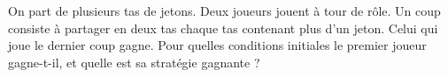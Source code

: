 On part de plusieurs tas de jetons. Deux joueurs jouent à tour de rôle. Un coup consiste à partager en deux tas chaque tas contenant plus d'un jeton. Celui qui joue le dernier coup gagne. Pour quelles conditions initiales le premier joueur gagne-t-il, et quelle est sa stratégie gagnante ?

